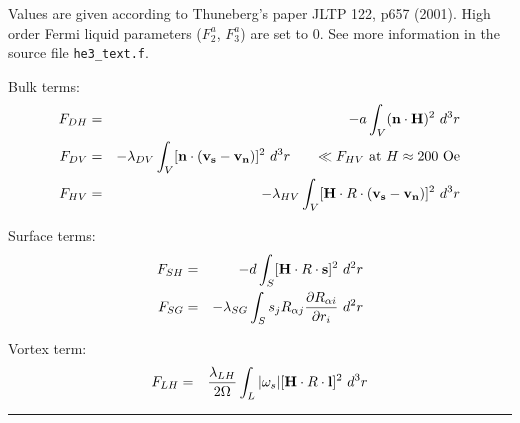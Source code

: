 \documentclass[a4paper]{article}
\begin{document}
Values are given according to Thuneberg's paper JLTP 122, p657 (2001).
High order Fermi liquid parameters ($F_2^a$, $F_3^a$) are set to 0.
See more information in the source file {\tt he3\_text.f}.

Bulk terms:
\begin{eqnarray*}
F_{DH} &=& -a
  \int_V ({\bf n} \cdot {\bf H})^2\ d^3r\\
F_{DV} &=& -\lambda_{DV}
  \int_V [{\bf n} \cdot ({\bf v_s}-{\bf v_n}) ]^2\ d^3r
\qquad {\ll F_{HV} \mbox{~at~} H\approx 200 \mbox{~Oe}}\\
F_{HV} &=& -\lambda_{HV}
  \int_V [{\bf H} \cdot R \cdot ({\bf v_s}-{\bf v_n}) ]^2\ d^3r\\
\end{eqnarray*}

Surface terms:
\begin{eqnarray*}
F_{SH} &=& -d
  \int_S [{\bf H} \cdot R \cdot {\bf s} ]^2\ d^2r\\
F_{SG} &=& -\lambda_{SG}
  \int_S s_j R_{\alpha j}
    \frac{\partial R_{\alpha i}}{\partial r_i}\ d^2r\\
\end{eqnarray*}

Vortex term:
\begin{eqnarray*}
F_{LH} &=& \frac{\lambda_{LH}}{2\Omega}
  \int_L |\omega_s| [{\bf H} \cdot R \cdot {\bf l} ]^2\ d^3r\\
\end{eqnarray*}

\hrule
\end{document}
